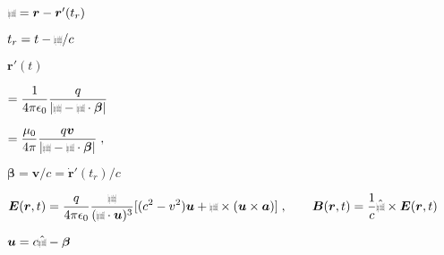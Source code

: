 \documentclass[12pt]{article}
\renewcommand{\vec}[1]{\boldsymbol{#1}}%
\def\lthtmlcheckvsize{\ifdim\ht\sizebox<\vsize 
  \ifdim\wd\sizebox<\hsize\expandafter\hfill\fi \expandafter\vfill
  \else\expandafter\vss\fi}%
\begin{document}
{\newpage\clearpage
{}%
$ {\mbox{$\resizebox{.09in}{.08in}{\texttt{[image: fonts/BoldR]}}$}}= \vec{r} - \vec{r}'(t_r)$%
\lthtmlindisplaymathZ
\lthtmlcheckvsize\clearpage}

{\newpage\clearpage
{}%
$ t_r = t -{\mbox{$\resizebox{.09in}{.08in}{\texttt{[image: fonts/ScriptR]}}$}}/c$%
\lthtmlindisplaymathZ
\lthtmlcheckvsize\clearpage}

{\newpage\clearpage
{}%
$ \vec{r}'(t)$%
\lthtmlindisplaymathZ
\lthtmlcheckvsize\clearpage}

{\newpage\clearpage
{}%
$\displaystyle = \frac{1}{4\pi\epsilon_0}    \frac{q}{\left| {\mbox{$\resizebox{.09in}{.08in}{\texttt{[image: fonts/ScriptR]}}$}}- {\mbox{$\resizebox{.09in}{.08in}{\texttt{[image: fonts/BoldR]}}$}}\cdot \vec{\beta} \right|}$%
\lthtmlindisplaymathZ
\lthtmlcheckvsize\clearpage}

{\newpage\clearpage
{}%
$\displaystyle = \frac{\mu_0}{4\pi}    \frac{q\vec{v}}{\left| {\mbox{$\resizebox{.09in}{.08in}{\texttt{[image: fonts/ScriptR]}}$}}- {\mbox{$\resizebox{.09in}{.08in}{\texttt{[image: fonts/BoldR]}}$}}\cdot \vec{\beta} \right|} \;,$%
\lthtmlindisplaymathZ
\lthtmlcheckvsize\clearpage}

{\newpage\clearpage
{}%
$ \vec{\beta} = \vec{v}/c = \dot{\vec{r}}'(t_r)/c$%
\lthtmlindisplaymathZ
\lthtmlcheckvsize\clearpage}

{\newpage\clearpage
{}%
$\displaystyle \vec{E}(\vec{r}, t)= \frac{q}{4\pi\epsilon_0} \frac{{\mbox{$\resizebox{.09in}{.08in}{\texttt{[image: fonts/ScriptR]}}$}}}{({\mbox{$\resizebox{.09in}{.08in}{\texttt{[image: fonts/BoldR]}}$}}\cdot \vec{u})^3}
[(c^2 - v^2)\vec{u} + {\mbox{$\resizebox{.09in}{.08in}{\texttt{[image: fonts/BoldR]}}$}}\times (\vec{u} \times \vec{a})] \; , \quad\quad \vec{B}(\vec{r}, t)
= \frac{1}{c}{\mbox{$\hat {\mbox{$\resizebox{.09in}{.08in}{\texttt{[image: fonts/BoldR]}}$}}$}}\times \vec{E}(\vec{r}, t)$%
\lthtmlindisplaymathZ
\lthtmlcheckvsize\clearpage}

{\newpage\clearpage
{}%
$ \vec{u} = c {\mbox{$\hat {\mbox{$\resizebox{.09in}{.08in}{\texttt{[image: fonts/BoldR]}}$}}$}}- \vec{\beta}$%
\lthtmlindisplaymathZ
\lthtmlcheckvsize\clearpage}
\end{document}
